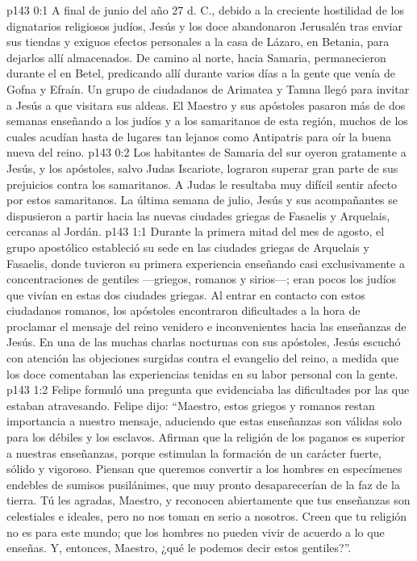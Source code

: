 \author{Comisión de seres intermedios}
\vs p143 0:1 A final de junio del año 27 d. C., debido a la creciente hostilidad de los dignatarios religiosos judíos, Jesús y los doce abandonaron Jerusalén tras enviar sus tiendas y exiguos efectos personales a la casa de Lázaro, en Betania, para dejarlos allí almacenados. De camino al norte, hacia Samaria, permanecieron durante el  en Betel, predicando allí durante varios días a la gente que venía de Gofna y Efraín. Un grupo de ciudadanos de Arimatea y Tamna llegó para invitar a Jesús a que visitara sus aldeas. El Maestro y sus apóstoles pasaron más de dos semanas enseñando a los judíos y a los samaritanos de esta región, muchos de los cuales acudían hasta de lugares tan lejanos como Antipatris para oír la buena nueva del reino.
\vs p143 0:2 Los habitantes de Samaria del sur oyeron gratamente a Jesús, y los apóstoles, salvo Judas Iscariote, lograron superar gran parte de sus prejuicios contra los samaritanos. A Judas le resultaba muy difícil sentir afecto por estos samaritanos. La última semana de julio, Jesús y sus acompañantes se dispusieron a partir hacia las nuevas ciudades griegas de Fasaelis y Arquelais, cercanas al Jordán.
\vs p143 1:1 Durante la primera mitad del mes de agosto, el grupo apostólico estableció su sede en las ciudades griegas de Arquelais y Fasaelis, donde tuvieron su primera experiencia enseñando casi exclusivamente a concentraciones de gentiles ---griegos, romanos y sirios---; eran pocos los judíos que vivían en estas dos ciudades griegas. Al entrar en contacto con estos ciudadanos romanos, los apóstoles encontraron dificultades a la hora de proclamar el mensaje del reino venidero e inconvenientes hacia las enseñanzas de Jesús. En una de las muchas charlas nocturnas con sus apóstoles, Jesús escuchó con atención las objeciones surgidas contra el evangelio del reino, a medida que los doce comentaban las experiencias tenidas en su labor personal con la gente.
\vs p143 1:2 Felipe formuló una pregunta que evidenciaba las dificultades por las que estaban atravesando. Felipe dijo: “Maestro, estos griegos y romanos restan importancia a nuestro mensaje, aduciendo que estas enseñanzas son válidas solo para los débiles y los esclavos. Afirman que la religión de los paganos es superior a nuestras enseñanzas, porque estimulan la formación de un carácter fuerte, sólido y vigoroso. Piensan que queremos convertir a los hombres en especímenes endebles de sumisos pusilánimes, que muy pronto desaparecerían de la faz de la tierra. Tú les agradas, Maestro, y reconocen abiertamente que tus enseñanzas son celestiales e ideales, pero no nos toman en serio a nosotros. Creen que tu religión no es para este mundo; que los hombres no pueden vivir de acuerdo a lo que enseñas. Y, entonces, Maestro, ¿qué le podemos decir estos gentiles?”.
